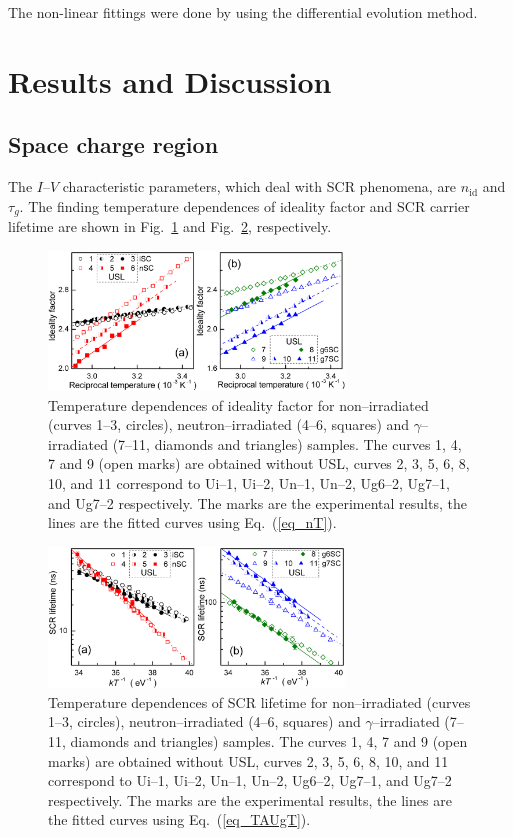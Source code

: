 \documentclass[aip,jap, amsmath,amssymb,reprint]{revtex4-1}
\begin{document}
The non-linear fittings were done by using the differential evolution method.\cite{DEWang}


\section{Results and Discussion}
\subsection{Space charge region\label{SCR}}
The $I$--$V$ characteristic parameters, which deal with SCR phenomena, are $n_{\mathrm{id}}$ and $\tau_{g}$.
The finding temperature dependences of ideality factor and SCR carrier lifetime are shown in Fig.~\ref{fig_n} and Fig.~\ref{fig_TAUg}, respectively.

\begin{figure}
\includegraphics[width=0.7\textwidth]{olikhFig2}%
\caption{\label{fig_n}
Temperature dependences of ideality factor for non--irradiated (curves 1--3, circles),
neutron--irradiated (4--6, squares) and $\gamma$--irradiated (7--11, diamonds and triangles) samples.
The curves 1, 4, 7 and 9 (open marks) are obtained without USL,
curves 2, 3, 5, 6, 8, 10, and 11 correspond to
Ui--1, Ui--2, Un--1, Un--2, Ug6--2, Ug7--1, and Ug7--2 respectively.
The marks are the experimental results, the lines are the fitted curves using Eq.~(\ref{eq_nT}).
}%
\end{figure}

\begin{figure}
\includegraphics[width=0.7\textwidth]{olikhFig3}%
\caption{\label{fig_TAUg}
Temperature dependences of SCR lifetime for non--irradiated (curves 1--3, circles),
neutron--irradiated (4--6, squares) and $\gamma$--irradiated (7--11, diamonds and triangles) samples.
The curves 1, 4, 7 and 9 (open marks) are obtained without USL,
curves 2, 3, 5, 6, 8, 10, and 11 correspond to
Ui--1, Ui--2, Un--1, Un--2, Ug6--2, Ug7--1, and Ug7--2 respectively.
The marks are the experimental results, the lines are the fitted curves using Eq.~(\ref{eq_TAUgT}).
}%
\end{figure}
\end{document}
